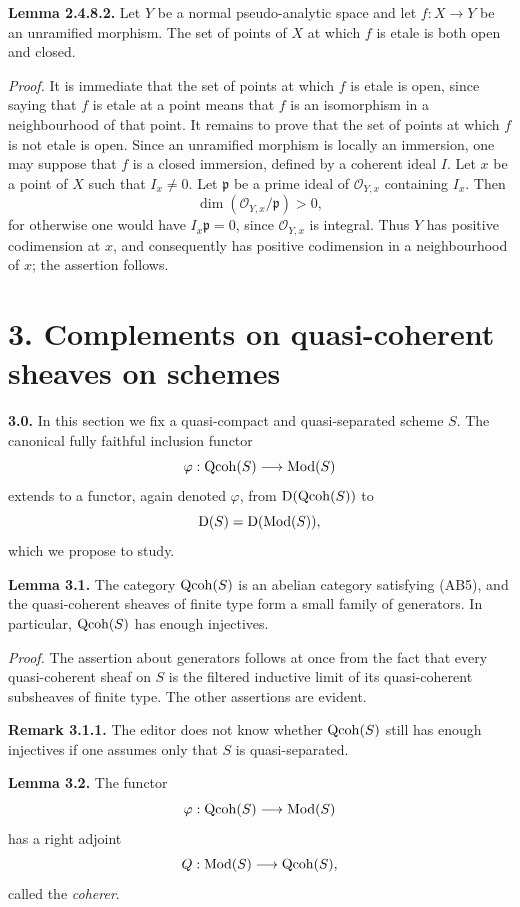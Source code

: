 \documentclass[11pt]{article}
\begin{document}
\textbf{Lemma 2.4.8.2.} Let $Y$ be a normal pseudo-analytic space and let $f:X\to Y$ be an unramified morphism. The set of points of $X$ at which $f$ is etale is both open and closed.

\emph{Proof.} It is immediate that the set of points at which $f$ is etale is open, since saying that $f$ is etale at a point means that $f$ is an isomorphism in a neighbourhood of that point. It remains to prove that the set of points at which $f$ is not etale is open. Since an unramified morphism is locally an immersion, one may suppose that $f$ is a closed immersion, defined by a coherent ideal $I$. Let $x$ be a point of $X$ such that $I_x\neq 0$. Let $\mathfrak p$ be a prime ideal of $\mathcal O_{Y,x}$ containing $I_x$. Then
\[
\dim(\mathcal O_{Y,x}/\mathfrak p)>0,
\]
for otherwise one would have $I_x\mathfrak p=0$, since $\mathcal O_{Y,x}$ is integral. Thus $Y$ has positive codimension at $x$, and consequently has positive codimension in a neighbourhood of $x$; the assertion follows.

\section*{3. Complements on quasi-coherent sheaves on schemes}

\textbf{3.0.} In this section we fix a quasi-compact and quasi-separated scheme $S$. The canonical fully faithful inclusion functor
\[
\varphi:\operatorname{Qcoh}(S)\longrightarrow\operatorname{Mod}(S)
\]
extends to a functor, again denoted $\varphi$, from $\mathrm D(\operatorname{Qcoh}(S))$ to
\[
\mathrm D(S)=\mathrm D(\operatorname{Mod}(S)),
\]
which we propose to study.

\textbf{Lemma 3.1.} The category $\operatorname{Qcoh}(S)$ is an abelian category satisfying (AB5), and the quasi-coherent sheaves of finite type form a small family of generators. In particular, $\operatorname{Qcoh}(S)$ has enough injectives.

\emph{Proof.} The assertion about generators follows at once from the fact that every quasi-coherent sheaf on $S$ is the filtered inductive limit of its quasi-coherent subsheaves of finite type. The other assertions are evident.

\textbf{Remark 3.1.1.} The editor does not know whether $\operatorname{Qcoh}(S)$ still has enough injectives if one assumes only that $S$ is quasi-separated.

\textbf{Lemma 3.2.} The functor
\[
\varphi:\operatorname{Qcoh}(S)\longrightarrow\operatorname{Mod}(S)
\]
has a right adjoint
\[
Q:\operatorname{Mod}(S)\longrightarrow\operatorname{Qcoh}(S),
\]
called the \emph{coherer}.
\end{document}
